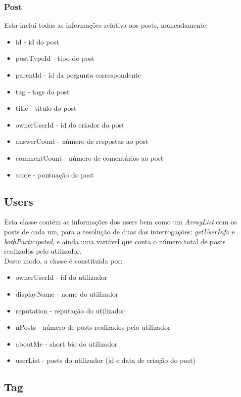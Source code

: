 \documentclass[10pt,a4paper]{article}
\begin{document}
\subsubsection{Post}

Esta inclui todas as informações relativa aos posts, nomeadamente:
\begin{itemize}
\item id - id do post
\item postTypeId - tipo do post
\item parentId - id da pergunta correspondente
\item tag - tags do post
\item title - título do post
\item ownerUserId - id do criador do post
\item answerCount - número de respostas ao post
\item commentCount - número de comentários ao post
\item score - pontuação do post
\end{itemize}

\subsection{Users}
Esta classe contém as informações dos users bem como um \textit{ArrayList} com os posts de cada um, para a resolução de duas das interrogações: \textit{getUserInfo} e \textit{bothParticipated}, e ainda uma variável que conta o número total de posts realizados pelo utilizador.\\

\indent Deste modo, a classe é constituída por:
\begin{itemize}
\item ownerUserId - id do utilizador
\item displayName - nome do utilizador
\item reputation - reputação do utilizador
\item nPosts - número de posts realizados pelo utilizador
\item aboutMe - short bio do utilizador
\item userList - posts do utilizador (id e data de criação do post)
\end{itemize}

\subsection{Tag}
\end{document}
